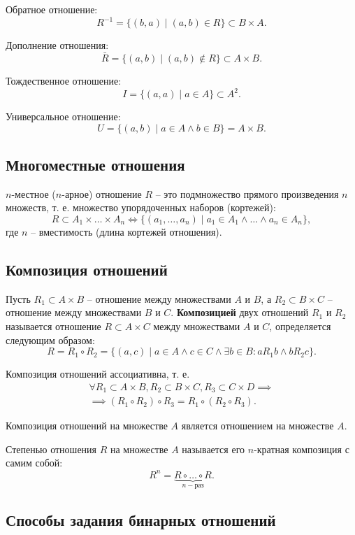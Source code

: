 Обратное отношение:
\[
    R^{-1} = \{(b, a) \mid (a, b) \in R\} \subset B \times A.
\]

Дополнение отношения:
\[
    \bar{R} = \{(a, b) \mid (a, b) \notin R\} \subset A \times B.
\]

Тождественное отношение:
\[
    I = \{(a, a) \mid a \in A\} \subset A^2.
\]

Универсальное отношение:
\[
    U = \{(a, b) \mid a \in A \land b \in B\} = A \times B.
\]

\subsection{Многоместные отношения}

\(n\)-местное (\(n\)-арное) отношение \(R\) -- это подмножество прямого произведения \(n\) множеств, т. е. множество упорядоченных наборов (кортежей):
\[
    R \subset A_1 \times \ldots \times A_n
    \iff
    \{(a_1, \ldots, a_n) \mid a_1 \in A_1 \land \ldots \land a_n \in A_n\},
\]
где \(n\) -- вместимость (длина кортежей отношения).

\subsection{Композиция отношений}

Пусть \(R_1 \subset A \times B\) -- отношение между множествами \(A\) и \(B\), а \(R_2 \subset B \times C\) -- отношение между множествами \(B\) и \(C\). \textbf{Композицией} двух отношений \(R_1\) и \(R_2\) называется отношение \(R \subset A \times C\) между множествами \(A\) и \(C\), определяется следующим образом:
\[
    R = R_1 \circ R_2 =
    \{(a, c) \mid a \in A \land c \in C \land \exists b \in B : a R_1 b \land b R_2 c\}.
\]

Композиция отношений ассоциативна, т. е.
\begin{gather*}
    \forall R_1 \subset A \times B, R_2 \subset B \times C, R_3 \subset C \times D
    \implies \\ \implies
    (R_1 \circ R_2) \circ R_3 = R_1 \circ (R_2 \circ R_3).
\end{gather*}

Композиция отношений на множестве \(A\) является отношением на множестве \(A\).

Степенью отношения \(R\) на множестве \(A\) называется его \(n\)-кратная композиция с самим собой:
\[
    R^n = \underbrace{R \circ \ldots \circ R}_{n-\text{раз}}.
\]


\subsection{Способы задания бинарных отношений}

